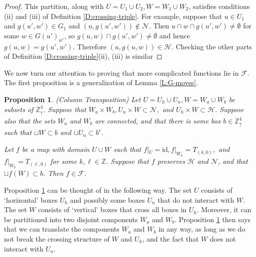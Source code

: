 \documentclass[aop, preprint]{imsart}
\theoremstyle{plain}
\newtheorem{prop}[theorem]{Proposition}%
\theoremstyle{definition}
\theoremstyle{plain}
\newcommand{\sset}{\subset}
\newcommand{\Zd}{\mathds{Z}^4_\uparrow}
\newcommand{\scrH}{\mathcal{H}}
\newcommand{\scrN}{\mathcal{N}}
\newcommand{\scrF}{\mathcal{F}}
\newcommand{\Z}{\mathds{Z}}
\newcommand{\X}{\times}
\newcommand{\id}{\text{id}}
\begin{document}
\begin{proof}
	This partition, along with $U = U_1 \cup U_2, W = W_1 \cup W_2$, satisfies conditions (ii) and (iii) of Definition \ref{D:crossing-triple}. For example, suppose that $u \in U_1$ and $g(u', w') \in G_1$ and $(u, g(u', w')) \notin \scrN$. Then  $u \cap w \cap g(u', w') \ne \emptyset$ for some $w \in G(u')_{w'}$, so $g(u, w) \cap g(u', w') \ne \emptyset$ and hence $g(u, w) = g(u', w')$. Therefore $(u, g(u, w)) \in \scrH$. Checking the other parts of Definition \ref{D:crossing-triple}(ii), (iii) is similar
\end{proof}

We now turn our attention to proving that more complicated functions lie in $\scrF$. The first proposition is a generalization of Lemma \ref{L:G-moves}.

\begin{prop}
	\label{P:basic-perm} (Column Transposition)
	Let
	$U = U_h \cup U_n, W = W_a \cup W_b$ be subsets of $\Zd$. Suppose that $W_a \X W_b, U_n \X W \sset \scrN,$ and $U_h \X W \sset \scrH$. Suppose also that the sets $W_a$ and $W_b$ are connected, and that there is some box $b \in \Zd$ such that $\sqcup W \sset b$ and $\sqcup U_n \sset b^c$.
	
	Let $f$ be a map with domain $U \cup W$ such that $f|_U = \id, f|_{W_a} = T_{(k, 0)},$ and $f|_{W_b} = T_{(\ell, 0)}$ for some $k, \ell \in \Z$. Suppose that $f$ preserves $\scrH$ and $\scrN$, and that $\sqcup f(W) \sset b$. Then $f \in \scrF$.
\end{prop}

Proposition \ref{P:basic-perm} can be thought of in the following way. The set $U$ consists of `horizontal' boxes $U_h$ and possibly some boxes $U_n$ that do not interact with $W$. The set $W$ consists of `vertical' boxes that cross all boxes in $U_h$. Moreover, it can be partitioned into two disjoint components $W_a$ and $W_b$. Proposition \ref{P:basic-perm} then says that we can translate the components $W_a$ and $W_b$ in any way, as long as we do not break the crossing structure of $W$ and $U_h$, and the fact that $W$ does not interact with $U_n$.
\end{document}
